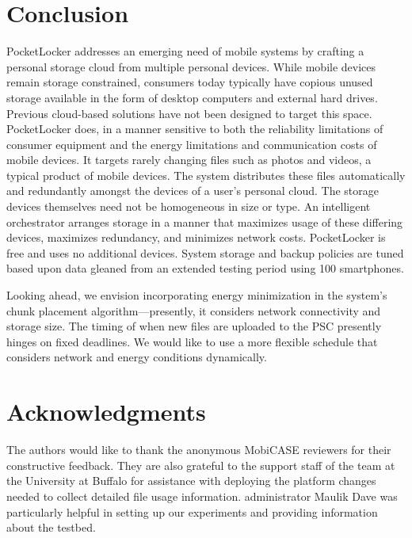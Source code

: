 
\section{Conclusion}
\label{sec-conclusion}

PocketLocker addresses an emerging need of mobile systems by crafting a
personal storage cloud from multiple personal devices.  While mobile devices
remain storage constrained, consumers today typically have copious unused
storage available in the form of desktop computers and external hard drives.
Previous cloud-based solutions have not been designed to target this space.
PocketLocker does, in a manner sensitive to both the reliability limitations of
consumer equipment and the energy limitations and communication costs of mobile
devices. It targets rarely changing files such as photos and videos, a typical
product of mobile devices.  The system distributes these files automatically
and redundantly amongst the devices of a user's personal cloud. The storage
devices themselves need not be homogeneous in size or type.  An intelligent
orchestrator arranges storage in a manner that maximizes usage of these
differing devices, maximizes redundancy, and minimizes network costs.
PocketLocker is free and uses no additional devices.  System storage and backup
policies are tuned based upon data gleaned from an extended testing period
using 100 smartphones.

Looking ahead, we envision incorporating energy minimization in the system's
chunk placement algorithm---presently, it considers network connectivity and
storage size.  The timing of when new files are uploaded to the PSC presently
hinges on fixed deadlines.  We would like to use a more flexible schedule that
considers network and energy conditions dynamically.

\section*{Acknowledgments}

The authors would like to thank the anonymous MobiCASE reviewers for their
constructive feedback. They are also grateful to the support staff of the
\PhoneLab{} team at the University at Buffalo for assistance with deploying the
platform changes needed to collect detailed file usage information. \PhoneLab{}
administrator Maulik Dave was particularly helpful in setting up our
experiments and providing information about the testbed.


